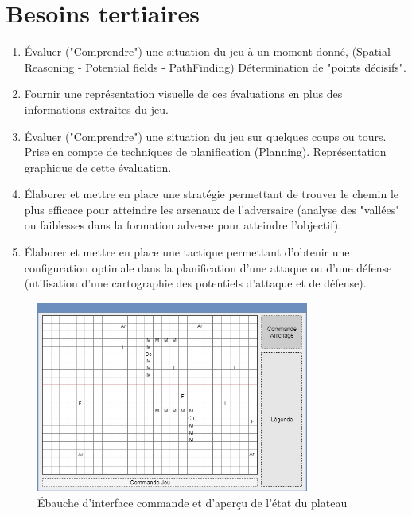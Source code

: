 \documentclass[a4paper]{report}
\begin{document}
\section{Besoins tertiaires} %

\begin{enumerate}

\item Évaluer ("Comprendre") une situation du jeu à un moment donné,
   (Spatial Reasoning\cite{spatial-reasoning} - Potential fields - PathFinding)
   Détermination de "points décisifs".
   
\item Fournir une représentation visuelle de ces évaluations en plus des informations extraites du jeu.

\item Évaluer ("Comprendre") une situation du jeu sur quelques coups ou tours.
   Prise en compte de techniques de planification (Planning).
   Représentation graphique de cette évaluation.

\item Élaborer et mettre en place une stratégie permettant de trouver le chemin le plus efficace pour atteindre les arsenaux de l'adversaire (analyse des "vallées" ou faiblesses dans la formation adverse pour atteindre l'objectif).

\item Élaborer et mettre en place une tactique permettant d'obtenir une configuration optimale dans la planification d'une attaque ou d'une défense (utilisation d'une cartographie des potentiels d'attaque et de défense).

\end{enumerate}



\begin{figure}[h]
\centering
\includegraphics[width=0.8\textwidth]{ui_maquette}
\caption{\'Ebauche d'interface commande et d'aperçu de l'état du plateau}
\label{fig:prerelease}
\end{figure}
\end{document}
